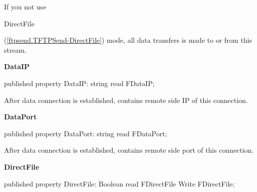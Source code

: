\documentclass{report}
\newif\ifpdf
\begin{document}
\begin{list}{}
\par If you not use \begin{ttfamily}DirectFile\end{ttfamily}(\ref{ftpsend.TFTPSend-DirectFile}) mode, all data transfers is made to or from this stream.\label{ftpsend.TFTPSend-DataIP}
\item[\textbf{DataIP}\hfill]
\ifpdf
\begin{flushleft}
\fi
\begin{ttfamily}
published property DataIP: string read FDataIP;\end{ttfamily}

\ifpdf
\end{flushleft}
\fi


\par After data connection is established, contains remote side IP of this connection.\label{ftpsend.TFTPSend-DataPort}
\item[\textbf{DataPort}\hfill]
\ifpdf
\begin{flushleft}
\fi
\begin{ttfamily}
published property DataPort: string read FDataPort;\end{ttfamily}

\ifpdf
\end{flushleft}
\fi


\par After data connection is established, contains remote side port of this connection.\label{ftpsend.TFTPSend-DirectFile}
\item[\textbf{DirectFile}\hfill]
\ifpdf
\begin{flushleft}
\fi
\begin{ttfamily}
published property DirectFile: Boolean read FDirectFile Write FDirectFile;\end{ttfamily}

\ifpdf
\end{flushleft}
\fi



\end{list}
\end{document}
